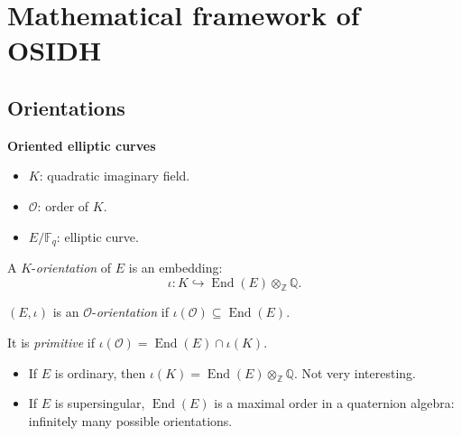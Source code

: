 \documentclass[10pt]{beamer}
\theoremstyle{plain}
\theoremstyle{definition}
\newcommand{\Z}{\mathbb{Z}}
\newcommand{\Q}{\mathbb{Q}}
\newcommand{\F}{\mathbb{F}}
\newcommand{\mO}{\mathcal{O}}
\renewcommand{\(}{\left(}
\renewcommand{\)}{\right)}
\DeclareMathOperator{\End}{End}
\begin{document}
\section{Mathematical framework of OSIDH}

\subsection{Orientations}

\begin{frame}
\textbf{Oriented elliptic curves}

\vspace{0.5cm}

\begin{itemize}
\item $K$: quadratic imaginary field.
\item $\mO$: order of $K$.
\item $E/\F_q$: elliptic curve.
\end{itemize}

\begin{definition}
A $K$-\emph{orientation} of $E$ is an embedding: 
\[\iota : K\hookrightarrow \End(E)\otimes_\Z\Q.\]

$(E, \iota)$ is an $\mO$-\emph{orientation} if $\iota(\mO)\subseteq \End(E)$.  

It is \emph{primitive} if $\iota(\mO)=\End(E)\cap\iota(K)$.
\end{definition}

\pause

\begin{itemize}
\item If $E$ is ordinary, then $\iota(K)=\End(E)\otimes_\Z\Q$. Not very interesting.

\pause
\item If $E$ is supersingular, $\End(E)$ is a maximal order in a quaternion algebra: infinitely many possible orientations.
\end{itemize}

\end{frame}
\end{document}
